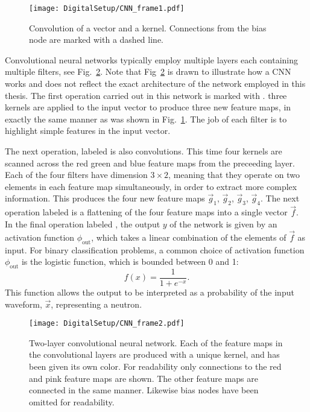 \documentclass[main.tex]{subfiles}
\begin{document}

\begin{figure}[h!]
    \centering
        \texttt{[image: DigitalSetup/CNN\_frame1.pdf]}
        \caption[Convolution of a vector and a kernel.]{Convolution of a vector and a kernel. Connections from the bias node are marked with a dashed line.}
    \label{fig:CNN_frame1} 
\end{figure}

Convolutional neural networks typically employ multiple layers each containing multiple filters, see Fig.~\ref{fig:CNN_frame2}. Note that Fig~\ref{fig:CNN_frame2} is drawn to illustrate how a CNN works and does not reflect the exact architecture of the network employed in this thesis.  The first operation carried out in this network is marked with . three kernels are applied to the input vector to produce three new feature maps, in exactly the same manner as was shown in Fig.~\ref{fig:CNN_frame1}. The job of  each filter is to highlight simple features in the input vector.

The next operation, labeled  is also convolutions. This time four kernels are scanned across the red green and blue feature maps from the preceeding layer. Each of the four filters have dimension $3\times2$, meaning that they operate on two elements in each feature map simultaneously, in order to extract more complex information. This produces the four new feature maps $\vec g_1$, $\vec g_2$, $\vec g_3$, $\vec g_4$. The next operation labeled  is a flattening of the four feature maps into a single vector $\vec f$. In the final operation labeled , the output $y$ of the network is given by an activation function $\phi_{\textrm{out}}$, which takes a linear combination of the elements of $\vec f$ as input. For binary classification problems, a common choice of activation function $\phi_{\textrm{out}}$ is the logistic function, which is bounded between 0 and 1:
\begin{equation}
	f(x) = \frac{1}{1+e^{-x}}.
\end{equation}
This function allows the output to be interpreted as a probability of the input waveform, $\vec{x}$, representing a neutron.

\begin{figure}[ht!]
    \centering
        \texttt{[image: DigitalSetup/CNN\_frame2.pdf]}
        \caption[Two-layer convolutional neural network.]{Two-layer convolutional neural network. Each of the feature maps in the convolutional layers are produced with a unique kernel, and has been given its own color. For readability only connections to the red and pink feature maps are shown. The other feature maps are connected in the same manner. Likewise bias nodes have been omitted for readability.}
    \label{fig:CNN_frame2} 
\end{figure}
\end{document}
